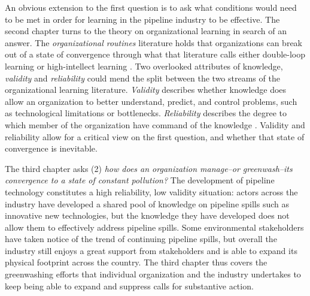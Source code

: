 An obvious extension to the first question is to ask what conditions would need to be met in order for learning in the pipeline industry to be effective. The second chapter turns to the theory on organizational learning in search of an answer. The \textit{organizational routines} literature holds that organizations can break out of a state of convergence through what that literature calls either double-loop learning \citep{Argyris1978} or high-intellect learning \citep{March2010}. Two overlooked attributes of knowledge, \textit{validity} and \textit{reliability} could mend the split between the two streams of the organizational learning literature. \textit{Validity} describes whether knowledge does allow an organization to better understand, predict, and control problems, such as technological limitations or bottlenecks. \textit{Reliability} describes the degree to which member of the organization have command of the knowledge \citep{Rerup2020}. Validity and reliability allow for a critical view on the first question, and whether that state of convergence is inevitable.

The third chapter asks (2) \textit{how does an organization manage--or greenwash--its convergence to a state of constant pollution?} 
The development of pipeline technology constitutes a high reliability, low validity situation: actors across the industry have developed a shared pool of knowledge on pipeline spills such as innovative new technologies, but the knowledge they have developed does not allow them to effectively address pipeline spills. Some environmental stakeholders have taken notice of the trend of continuing pipeline spills, but overall the industry still enjoys a great support from stakeholders and is able to expand its physical footprint across the country. The third chapter thus covers the greenwashing efforts that individual organization and the industry undertakes to keep being able to expand and suppress calls for substantive action.


